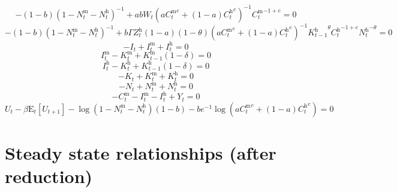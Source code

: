 \begin{equation}
-\left(1 - b\right) \left(1 - N^{\mathrm{m}}_{t} - N^{\mathrm{h}}_{t}\right)^{-1} + {a} {b} {W_{t}} \left({a} {{C^{\mathrm{m}}_{t}}^{e}} + \left(1 - a\right) {{C^{\mathrm{h}}_{t}}^{e}}\right)^{-1} {{C^{\mathrm{m}}_{t}}^{-1 + e}} = 0
\end{equation}
\begin{equation}
-\left(1 - b\right) \left(1 - N^{\mathrm{m}}_{t} - N^{\mathrm{h}}_{t}\right)^{-1} + {b} {\Gamma} {Z^{\mathrm{h}}_{t}} \left(1 - a\right) \left(1 - \theta\right) \left({a} {{C^{\mathrm{m}}_{t}}^{e}} + \left(1 - a\right) {{C^{\mathrm{h}}_{t}}^{e}}\right)^{-1} {{K^{\mathrm{h}}_{t-1}}^{\theta}} {{C^{\mathrm{h}}_{t}}^{-1 + e}} {{N^{\mathrm{h}}_{t}}^{-\theta}} = 0
\end{equation}
\begin{equation}
-I_{t} + I^{\mathrm{m}}_{t} + I^{\mathrm{h}}_{t} = 0
\end{equation}
\begin{equation}
I^{\mathrm{m}}_{t} - K^{\mathrm{m}}_{t} + {K^{\mathrm{m}}_{t-1}} \left(1 - \delta\right) = 0
\end{equation}
\begin{equation}
I^{\mathrm{h}}_{t} - K^{\mathrm{h}}_{t} + {K^{\mathrm{h}}_{t-1}} \left(1 - \delta\right) = 0
\end{equation}
\begin{equation}
-K_{t} + K^{\mathrm{m}}_{t} + K^{\mathrm{h}}_{t} = 0
\end{equation}
\begin{equation}
-N_{t} + N^{\mathrm{m}}_{t} + N^{\mathrm{h}}_{t} = 0
\end{equation}
\begin{equation}
-C^{\mathrm{m}}_{t} - I^{\mathrm{m}}_{t} - I^{\mathrm{h}}_{t} + Y_{t} = 0
\end{equation}
\begin{equation}
U_{t} - {\beta} {\mathrm{E}_{t}\left[U_{t+1}\right]} - {\log\left(1 - N^{\mathrm{m}}_{t} - N^{\mathrm{h}}_{t}\right)} \left(1 - b\right) - {b} {e}^{-1} {\log\left({a} {{C^{\mathrm{m}}_{t}}^{e}} + \left(1 - a\right) {{C^{\mathrm{h}}_{t}}^{e}}\right)} = 0
\end{equation}



\section{Steady state relationships (after reduction)}

